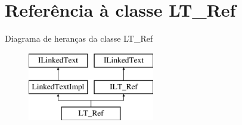\hypertarget{class_l_t___ref}{\section{Referência à classe L\-T\-\_\-\-Ref}
\label{class_l_t___ref}
}
Diagrama de heranças da classe L\-T\-\_\-\-Ref\begin{figure}[H]
\begin{center}
\leavevmode
\includegraphics[height=3.000000cm]{class_l_t___ref}
\end{center}
\end{figure}
